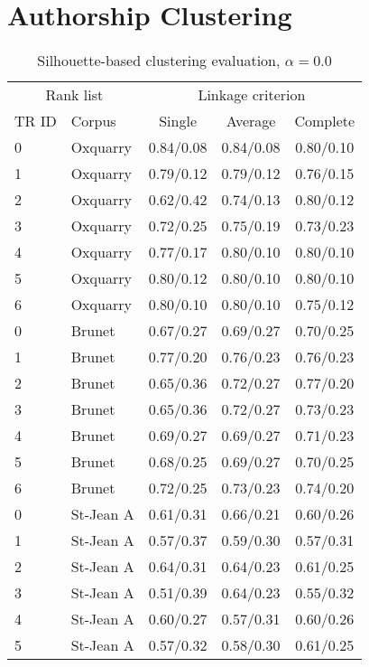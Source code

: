 \section*{Authorship Clustering}

\begin{table}[H]
  \centering
  \caption{Silhouette-based clustering evaluation, $\alpha = 0.0$}
  \label{tab:silhouette-based_clustering_full}

  \begin{tabular}{l l c c c}
    \toprule
    \multicolumn{2}{c}{Rank list} & \multicolumn{3}{c}{Linkage criterion} \\
    TR ID & Corpus & Single & Average & Complete \\
    \midrule
    0 & Oxquarry & 0.84/0.08 & 0.84/0.08 & 0.80/0.10 \\
    1 & Oxquarry & 0.79/0.12 & 0.79/0.12 & 0.76/0.15 \\
    2 & Oxquarry & 0.62/0.42 & 0.74/0.13 & 0.80/0.12 \\
    3 & Oxquarry & 0.72/0.25 & 0.75/0.19 & 0.73/0.23 \\
    4 & Oxquarry & 0.77/0.17 & 0.80/0.10 & 0.80/0.10 \\
    5 & Oxquarry & 0.80/0.12 & 0.80/0.10 & 0.80/0.10 \\
    6 & Oxquarry & 0.80/0.10 & 0.80/0.10 & 0.75/0.12 \\
    0 & Brunet & 0.67/0.27 & 0.69/0.27 & 0.70/0.25 \\
    1 & Brunet & 0.77/0.20 & 0.76/0.23 & 0.76/0.23 \\
    2 & Brunet & 0.65/0.36 & 0.72/0.27 & 0.77/0.20 \\
    3 & Brunet & 0.65/0.36 & 0.72/0.27 & 0.73/0.23 \\
    4 & Brunet & 0.69/0.27 & 0.69/0.27 & 0.71/0.23 \\
    5 & Brunet & 0.68/0.25 & 0.69/0.27 & 0.70/0.25 \\
    6 & Brunet & 0.72/0.25 & 0.73/0.23 & 0.74/0.20 \\
    0 & St-Jean A & 0.61/0.31 & 0.66/0.21 & 0.60/0.26 \\
    1 & St-Jean A & 0.57/0.37 & 0.59/0.30 & 0.57/0.31 \\
    2 & St-Jean A & 0.64/0.31 & 0.64/0.23 & 0.61/0.25 \\
    3 & St-Jean A & 0.51/0.39 & 0.64/0.23 & 0.55/0.32 \\
    4 & St-Jean A & 0.60/0.27 & 0.57/0.31 & 0.60/0.26 \\
    5 & St-Jean A & 0.57/0.32 & 0.58/0.30 & 0.61/0.25 \\

\end{tabular}
\end{table}
